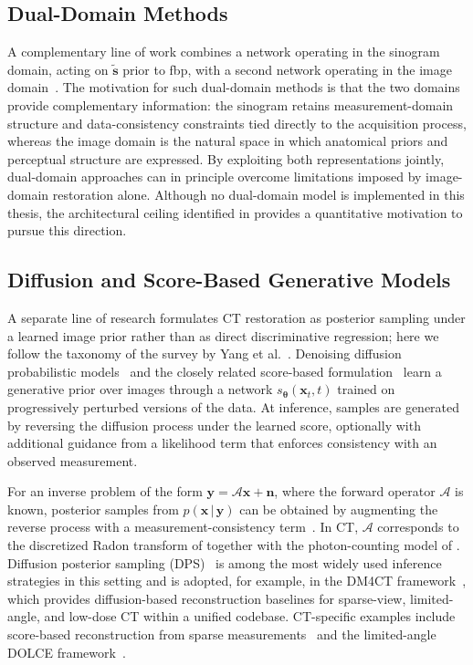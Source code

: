 \subsection{Dual-Domain Methods}
\label{subsec:bg_dual_domain}

A complementary line of work combines a network operating in the sinogram domain, acting on $\tilde{\boldsymbol{s}}$ prior to \gls{fbp}, with a second network operating in the image domain~\cite{Wang2020, Zhang2022, Lin2019DuDoNet}. The motivation for such dual-domain methods is that the two domains provide complementary information: the sinogram retains measurement-domain structure and data-consistency constraints tied directly to the acquisition process, whereas the image domain is the natural space in which anatomical priors and perceptual structure are expressed. By exploiting both representations jointly, dual-domain approaches can in principle overcome limitations imposed by image-domain restoration alone. Although no dual-domain model is implemented in this thesis, the architectural ceiling identified in  provides a quantitative motivation to pursue this direction.

\subsection{Diffusion and Score-Based Generative Models}
\label{subsec:bg_diffusion}

A separate line of research formulates CT restoration as posterior sampling under a learned image prior rather than as direct discriminative regression; here we follow the taxonomy of the survey by Yang et al.~\cite{Yang2024DiffusionSurvey}. Denoising diffusion probabilistic models~\cite{Ho2020} and the closely related score-based formulation~\cite{SongErmon2019, Song2021} learn a generative prior over images through a network \(s_{\boldsymbol{\theta}}(\boldsymbol{x}_t, t)\) trained on progressively perturbed versions of the data. At inference, samples are generated by reversing the diffusion process under the learned score, optionally with additional guidance from a likelihood term that enforces consistency with an observed measurement.

For an inverse problem of the form \(\boldsymbol{y} = \mathcal{A}\boldsymbol{x} + \boldsymbol{n}\), where the forward operator \(\mathcal{A}\) is known, posterior samples from \(p(\boldsymbol{x}\,|\,\boldsymbol{y})\) can be obtained by augmenting the reverse process with a measurement-consistency term~\cite{Song2022, Chung2023}. In CT, \(\mathcal{A}\) corresponds to the discretized Radon transform of  together with the photon-counting model of . Diffusion posterior sampling (DPS)~\cite{Chung2023} is among the most widely used inference strategies in this setting and is adopted, for example, in the DM4CT framework~\cite{DM4CT2025}, which provides diffusion-based reconstruction baselines for sparse-view, limited-angle, and low-dose CT within a unified codebase. CT-specific examples include score-based reconstruction from sparse measurements~\cite{Song2022} and the limited-angle DOLCE framework~\cite{Liu2023DOLCE}.


